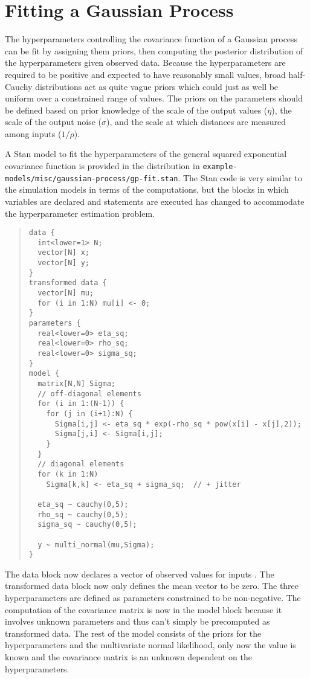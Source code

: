 \section{Fitting a Gaussian Process}\label{fit-gp.section}

The hyperparameters controlling the covariance function of a Gaussian
process can be fit by assigning them priors, then computing the
posterior distribution of the hyperparameters given observed data.
Because the hyperparameters are required to be positive and expected
to have reasonably small values, broad half-Cauchy distributions act
as quite vague priors which could just as well be uniform over a
constrained range of values.  The priors on the parameters should be
defined based on prior knowledge of the scale of the output values
($\eta$), the scale of the output noise ($\sigma$), and the scale at
which distances are measured among inputs ($1/\rho$).

A Stan model to fit the hyperparameters of the general squared
exponential covariance function is provided in the distribution in
\nolinkurl{example-models/misc/gaussian-process/gp-fit.stan}.  The Stan
code is very similar to the simulation models in terms of the
computations, but the blocks in which variables are declared and
statements are executed has changed to accommodate the hyperparameter
estimation problem.
%
\begin{quote}
\begin{Verbatim}[fontsize=\small]
data {
  int<lower=1> N;
  vector[N] x;
  vector[N] y;
}
transformed data {
  vector[N] mu;
  for (i in 1:N) mu[i] <- 0;
}
parameters {
  real<lower=0> eta_sq;
  real<lower=0> rho_sq;
  real<lower=0> sigma_sq;
}
model {
  matrix[N,N] Sigma;
  // off-diagonal elements
  for (i in 1:(N-1)) {
    for (j in (i+1):N) {
      Sigma[i,j] <- eta_sq * exp(-rho_sq * pow(x[i] - x[j],2));
      Sigma[j,i] <- Sigma[i,j];
    }
  }
  // diagonal elements
  for (k in 1:N)
    Sigma[k,k] <- eta_sq + sigma_sq;  // + jitter

  eta_sq ~ cauchy(0,5);
  rho_sq ~ cauchy(0,5);
  sigma_sq ~ cauchy(0,5);

  y ~ multi_normal(mu,Sigma);
}
\end{Verbatim}
\end{quote}
%
The data block now declares a vector  of observed values
 for inputs .  The transformed data block now
only defines the mean vector to be zero.  The three hyperparameters
are defined as parameters constrained to be non-negative.  The
computation of the covariance matrix  is now in the model
block because it involves unknown parameters and thus can't simply be
precomputed as transformed data.  The rest of the model consists of
the priors for the hyperparameters and the multivariate
normal likelihood, only now the value  is known and the
covariance matrix  is an unknown dependent on the
hyperparameters.  

